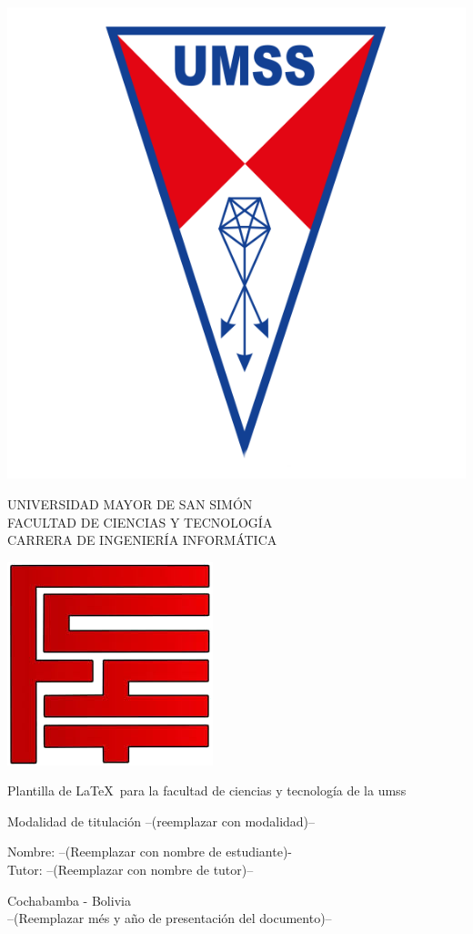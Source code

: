 \documentclass[
  12pt,                       %
  letterpapper,               %
  twoside,                    %
  openright                   %
]{book}                       %
\begin{document}
\begin{titlepage}

  \thispagestyle{empty}
  \parbox[c]{.15\textwidth}{
    \includegraphics[width=.15\textwidth]{umss-logo}
  }
  \hfill
  \parbox[c]{.5\textwidth}{
    \footnotesize
    UNIVERSIDAD MAYOR DE SAN SIMÓN \\
    FACULTAD DE CIENCIAS Y TECNOLOGÍA \\
    CARRERA DE INGENIERÍA INFORMÁTICA
  }
  \hfill
  \parbox[c]{.15\textwidth}{
    \includegraphics[width=.15\textwidth]{fcyt-logo}
  }

  \vspace{.2\textheight}
  \begin{center}
    \parbox[c]{.8\textwidth}{
      \centering\huge
      Plantilla de \LaTeX\ para la facultad de ciencias y tecnología de la umss
      \par
    }
  \end{center}

  \vspace{.08\textheight}

  \begin{center}
    \Large
    Modalidad de titulación --(reemplazar con modalidad)--
  \end{center}

  \vspace{12pt}

  \begin{center}
    \parbox[c]{.8\textwidth}{
      \large
      Nombre: --(Reemplazar con nombre de estudiante)- \\
      Tutor: --(Reemplazar con nombre de tutor)-- \\
    }
  \end{center}

  \null\vfill

  {\centering\Large
    Cochabamba - Bolivia \\
    --(Reemplazar més y año de presentación del documento)--
    \par
  }
\end{titlepage}
\end{document}
